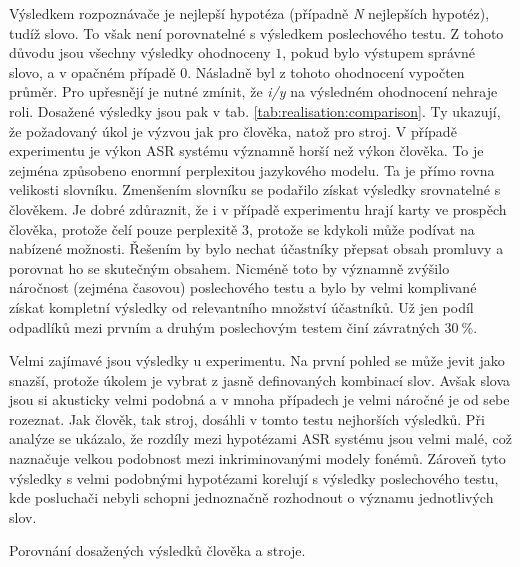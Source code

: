 Výsledkem rozpoznávače je nejlepší hypotéza (případně \textit{N} nejlepších hypotéz), tudíž slovo. To však není porovnatelné s výsledkem poslechového testu. Z tohoto důvodu jsou všechny výsledky ohodnoceny $1$, pokud bylo výstupem správné slovo, a v opačném případě $0$. Násladně byl z tohoto ohodnocení vypočten průměr. Pro upřesnějí je nutné zmínit, že \textit{i/y} na výsledném ohodnocení nehraje roli. Dosažené výsledky jsou pak v tab. \ref{tab:realisation:comparison}. Ty ukazují, že požadovaný úkol je výzvou jak pro člověka, natož pro stroj. V případě experimentu  je výkon ASR systému významně horší než výkon člověka. To je zejména způsobeno enormní perplexitou jazykového modelu. Ta je přímo rovna velikosti slovníku. Zmenšením slovníku se podařilo získat výsledky srovnatelné s člověkem. Je dobré zdůraznit, že i v případě  experimentu hrají karty ve prospěch člověka, protože čelí pouze perplexitě $3$, protože se kdykoli může podívat na nabízené možnosti. Řešením by bylo nechat účastníky přepsat obsah promluvy a porovnat ho se skutečným obsahem. Nicméně toto by významně zvýšilo náročnost (zejména časovou) poslechového testu a bylo by velmi komplivané získat kompletní výsledky od relevantního množství účastníků. Už jen podíl odpadlíků mezi prvním a druhým poslechovým testem činí závratných $30\ \%$.

Velmi zajímavé jsou výsledky u  experimentu. Na první pohled se může jevit jako snazší, protože úkolem je vybrat z jasně definovaných kombinací slov. Avšak slova jsou si akusticky velmi podobná a v mnoha případech je velmi náročné je od sebe rozeznat. Jak člověk, tak stroj, dosáhli v tomto testu nejhorších výsledků. Při analýze se ukázalo, že rozdíly mezi hypotézami ASR systému jsou velmi malé, což naznačuje velkou podobnost mezi inkriminovanými modely fonémů. Zároveň tyto výsledky s velmi podobnými hypotézami korelují s výsledky poslechového testu, kde posluchači nebyli schopni jednoznačně rozhodnout o významu jednotlivých slov.

\begin{table}[htpb]
  \centering
  \def\arraystretch{1.5}
  \caption{Porovnání dosažených výsledků člověka a stroje.}
  \label{tab:realisation:comparison}
\end{table}

